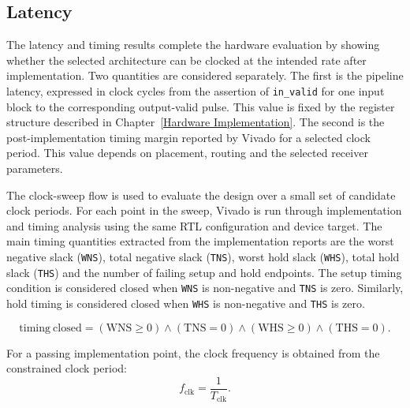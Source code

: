 \subsection{Latency}\label{subsec:results-latency-timing}

The latency and timing results complete the hardware evaluation by showing whether the selected architecture can be clocked at the intended rate after implementation. Two quantities are considered separately. The first is the pipeline latency, expressed in clock cycles from the assertion of \texttt{in\_valid} for one input block to the corresponding output-valid pulse. This value is fixed by the register structure described in Chapter~\ref{Hardware Implementation}. The second is the post-implementation timing margin reported by Vivado for a selected clock period. This value depends on placement, routing and the selected receiver parameters.

The clock-sweep flow is used to evaluate the design over a small set of candidate clock periods. For each point in the sweep, Vivado is run through implementation and timing analysis using the same \ac{RTL} configuration and device target. The main timing quantities extracted from the implementation reports are the worst negative slack (\texttt{WNS}), total negative slack (\texttt{TNS}), worst hold slack (\texttt{WHS}), total hold slack (\texttt{THS}) and the number of failing setup and hold endpoints. The setup timing condition is considered closed when \texttt{WNS} is non-negative and \texttt{TNS} is zero. Similarly, hold timing is considered closed when \texttt{WHS} is non-negative and \texttt{THS} is zero.

\begin{equation}
    \mathrm{timing~closed}
    =
    (\mathrm{WNS} \geq 0)
    \land
    (\mathrm{TNS} = 0)
    \land
    (\mathrm{WHS} \geq 0)
    \land
    (\mathrm{THS} = 0).
    \label{eq:results-timing-closure}
\end{equation}

For a passing implementation point, the clock frequency is obtained from the constrained clock period:
\begin{equation}
    f_{\mathrm{clk}} = \frac{1}{T_{\mathrm{clk}}}.
    \label{eq:results-clock-frequency}
\end{equation}

